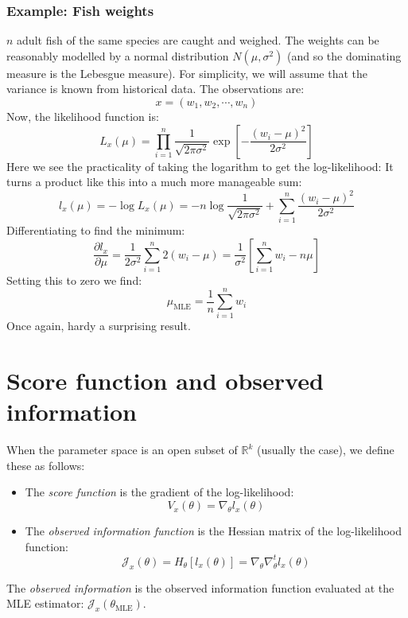 \documentclass[12pt, a4paper]{article}
\numberwithin{equation}{section}
\begin{document}
\subsubsection{Example: Fish weights}
$n$ adult fish of the same species are caught and weighed. The weights can be reasonably modelled by a normal distribution $N(\mu,\sigma^2)$ (and so the dominating measure is the Lebesgue measure). For simplicity, we will assume that the variance is known from historical data. The observations are:
\begin{equation}
x=(w_1,w_2,\cdots,w_n)
\end{equation}
Now, the likelihood function is:
\begin{equation}
L_x(\mu)=\prod_{i=1}^n\frac{1}{\sqrt{2\pi\sigma^2}}\exp\left[-\frac{(w_i-\mu)^2}{2\sigma^2}\right]
\end{equation}
Here we see the practicality of taking the logarithm to get the log-likelihood: It turns a product like this into a much more manageable sum:
\begin{equation}
l_x(\mu)=-\log L_x(\mu)=-n\log\frac{1}{\sqrt{2\pi\sigma^2}}+\sum_{i=1}^n\frac{(w_i-\mu)^2}{2\sigma^2}
\end{equation}
Differentiating to find the minimum:
\begin{equation}
\frac{\partial l_x}{\partial\mu}=\frac{1}{2\sigma^2}\sum_{i=1}^n 2(w_i-\mu)=\frac{1}{\sigma^2}\left[\sum_{i=1}^n w_i-n\mu\right]
\end{equation}
Setting this to zero we find:
\begin{equation}
\mu_{\textrm{MLE}}=\frac{1}{n}\sum_{i=1}^n w_i
\end{equation}
Once again, hardy a surprising result.

\section{Score function and observed information}
When the parameter space is an open subset of $\mathbb{R}^k$ (usually the case), we define these as follows:
\begin{itemize}
\item The \textit{score function} is the gradient of the log-likelihood:
\begin{equation}
V_x(\theta)=\nabla_\theta l_x(\theta)
\end{equation}
\item The \textit{observed information function} is the Hessian matrix of the log-likelihood function:
\begin{equation}
\mathcal{J}_x(\theta)=H_\theta[l_x(\theta)]=\nabla_\theta\nabla^t_\theta l_x(\theta)
\end{equation}
\end{itemize}
The \textit{observed information} is the observed information function evaluated at the MLE estimator: $\mathcal{J}_x(\theta_{\textrm{MLE}})$.
\end{document}

